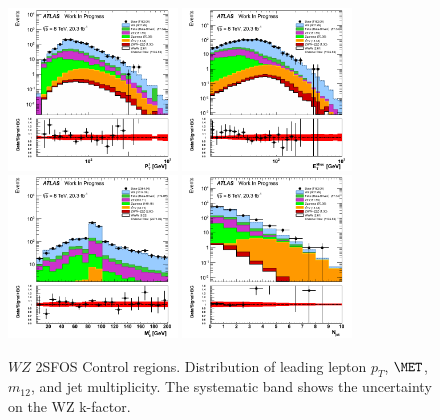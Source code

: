 \begin{figure}[htp]
\centering
\includegraphics[width=0.4\textwidth]{figures/WZ_CR/LeadingLeptonPt_histratio.png}
\includegraphics[width=0.4\textwidth]{figures/WZ_CR/MET_Et_histratio.png}
\includegraphics[width=0.4\textwidth]{figures/WZ_CR/InvariantMassSFOS_histratio.png}
\includegraphics[width=0.4\textwidth]{figures/WZ_CR/NJets_histratio.png}

\caption{$WZ$ 2SFOS Control regions. Distribution of leading lepton $p_{T}$, $\MET$, $m_{12}$, and jet multiplicity. The systematic band shows the uncertainty on the WZ k-factor.}
\label{fig:WZ_2SFOS_CR}
\end{figure}  


